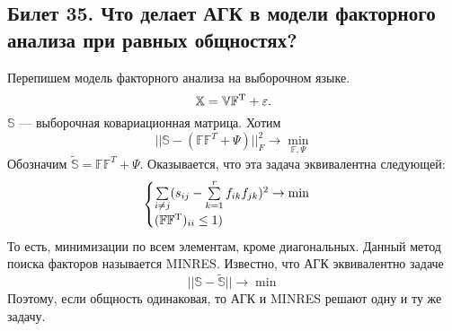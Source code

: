 \subsection{Билет 35. Что делает АГК в модели факторного анализа при равных общностях?}
Перепишем модель факторного анализа на выборочном языке.
\begin{equation*}
\mathbb{X} = \mathbb{V}\mathbb{F}^{\operatorname*{T}} + \varepsilon.
\end{equation*}
$\mathbb{S}$ --- выборочная ковариационная матрица. 
Хотим 
\begin{equation*}
|| \mathbb{S} - (\mathbb{F}\mathbb{F}^T + \Psi)||^2_{F} \to \min\limits_{\mathbb{F}, \Psi}
\end{equation*}
Обозначим $\tilde{\mathbb{S}} = \mathbb{F}\mathbb{F}^T + \Psi$.
Оказывается, что эта задача эквивалентна следующей:
\begin{equation*}
\begin{cases}
\sum\limits_{i \ne j}(s_{ij} - \sum\limits_{k = 1}^{r} f_{ik}f_{jk})^2 \to \min \\
(\mathbb{F}\mathbb{F}^{\operatorname*{T}})_{ii} \le 1) 
\end{cases}
\end{equation*}
То есть, минимизации по всем элементам, кроме диагональных.
Данный метод поиска факторов называется MINRES.
Известно, что АГК эквивалентно задаче
\begin{equation}
||\mathbb{S} - \tilde{\mathbb{S}}|| \to \min
\end{equation}
Поэтому, если общность одинаковая, то АГК и MINRES решают одну и ту же задачу.